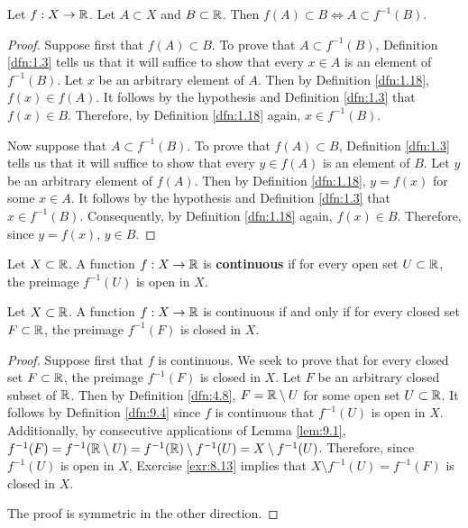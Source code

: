\documentclass[../main.tex]{subfiles}
\begin{document}
\begin{exercise}\label{exr:9.3}
    Let $f:X\to\mathbb{R}$. Let $A\subset X$ and $B\subset\mathbb{R}$. Then $f(A)\subset B\Longleftrightarrow A\subset f^{-1}(B)$.
    \begin{proof}
        Suppose first that $f(A)\subset B$. To prove that $A\subset f^{-1}(B)$, Definition \ref{dfn:1.3} tells us that it will suffice to show that every $x\in A$ is an element of $f^{-1}(B)$. Let $x$ be an arbitrary element of $A$. Then by Definition \ref{dfn:1.18}, $f(x)\in f(A)$. It follows by the hypothesis and Definition \ref{dfn:1.3} that $f(x)\in B$. Therefore, by Definition \ref{dfn:1.18} again, $x\in f^{-1}(B)$.\par
        Now suppose that $A\subset f^{-1}(B)$. To prove that $f(A)\subset B$, Definition \ref{dfn:1.3} tells us that it will suffice to show that every $y\in f(A)$ is an element of $B$. Let $y$ be an arbitrary element of $f(A)$. Then by Definition \ref{dfn:1.18}, $y=f(x)$ for some $x\in A$. It follows by the hypothesis and Definition \ref{dfn:1.3} that $x\in f^{-1}(B)$. Consequently, by Definition \ref{dfn:1.18} again, $f(x)\in B$. Therefore, since $y=f(x)$, $y\in B$.
    \end{proof}
\end{exercise}

\begin{definition}\label{dfn:9.4}
    Let $X\subset\mathbb{R}$. A function $f:X\to\mathbb{R}$ is \textbf{continuous} if for every open set $U\subset\mathbb{R}$, the preimage $f^{-1}(U)$ is open in $X$.
\end{definition}

\begin{proposition}\label{prp:9.5}
    Let $X\subset\mathbb{R}$. A function $f:X\to\mathbb{R}$ is continuous if and only if for every closed set $F\subset\mathbb{R}$, the preimage $f^{-1}(F)$ is closed in $X$.
    \begin{proof}
        Suppose first that $f$ is continuous. We seek to prove that for every closed set $F\subset\mathbb{R}$, the preimage $f^{-1}(F)$ is closed in $X$. Let $F$ be an arbitrary closed subset of $\mathbb{R}$. Then by Definition \ref{dfn:4.8}, $F=\mathbb{R}\setminus U$ for some open set $U\subset\mathbb{R}$. It follows by Definition \ref{dfn:9.4} since $f$ is continuous that $f^{-1}(U)$ is open in $X$. Additionally, by consecutive applications of Lemma \ref{lem:9.1}, $f^{-1}(F)=f^{-1}(\mathbb{R}\setminus U)=f^{-1}(\mathbb{R})\setminus f^{-1}(U)=X\setminus f^{-1}(U)$. Therefore, since $f^{-1}(U)$ is open in $X$, Exercise \ref{exr:8.13} implies that $X\setminus f^{-1}(U)=f^{-1}(F)$ is closed in $X$.\par
        The proof is symmetric in the other direction.
    \end{proof}
\end{proposition}
\end{document}
